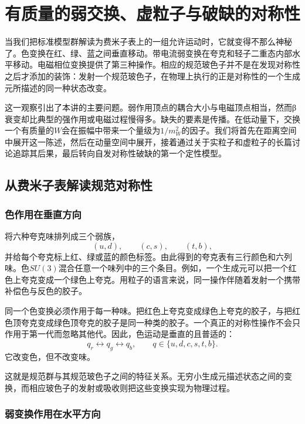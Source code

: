 \chapter{有质量的弱交换、虚粒子与破缺的对称性}

当我们把标准模型群解读为费米子表上的一组允许运动时，它就变得不那么神秘了。色变换在红、绿、蓝之间垂直移动。带电流弱变换在夸克和轻子二重态内部水平移动。电磁相位变换提供了第三种操作。相应的规范玻色子并不是在发现对称性之后才添加的装饰：发射一个规范玻色子，在物理上执行的正是对称性的一个生成元所描述的同一种状态改变。

这一观察引出了本讲的主要问题。弱作用顶点的耦合大小与电磁顶点相当，然而{\proseunicodefont β}衰变却比典型的强作用或电磁过程慢得多。缺失的要素是传播。在低动量下，交换一个有质量的\(W\)会在振幅中带来一个量级为\(1/m_W^2\)的因子。我们将首先在距离空间中展开这一陈述，然后在动量空间中展开，接着通过关于实粒子和虚粒子的长篇讨论追踪其后果，最后转向自发对称性破缺的第一个定性模型。

\section{从费米子表解读规范对称性}

\subsection{色作用在垂直方向}

将六种夸克味排列成三个弱族，
\begin{equation}
  (u,d),\qquad(c,s),\qquad(t,b),
\end{equation}
并给每个夸克标上红、绿或蓝的颜色标签。由此得到的夸克表有三行颜色和六列味。色\(SU(3)\)混合任意一个味列中的三个条目。例如，一个生成元可以把一个红色上夸克变成一个绿色上夸克。用粒子的语言来说，同一操作伴随着发射一个携带补偿色与反色的胶子。

同一个色变换必须作用于每一种味。把红色上夸克变成绿色上夸克的胶子，与把红色顶夸克变成绿色顶夸克的胶子是同一种类的胶子。一个真正的对称性操作不会只作用于第一代而忽略其他代。因此，色运动是垂直的且普适的：
\begin{equation}
  q_r\longleftrightarrow q_g\longleftrightarrow q_b,
  \qquad q\in\{u,d,c,s,t,b\}.
\end{equation}
它改变色，但不改变味。

这就是规范群与其规范玻色子之间的特征关系。无穷小生成元描述状态之间的变换，而相应玻色子的发射或吸收则把这些变换实现为物理过程。

\subsection{弱变换作用在水平方向}

